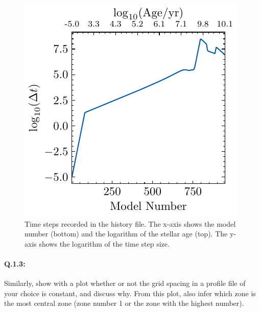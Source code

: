 \documentclass[twocolumn,fontsize=11pt]{scrartcl}
\begin{document}
\begin{figure}[htbp]
    \centering
    \includegraphics{log_dt_vs_model_number.pdf}
    \caption{Time steps recorded in the history file. The x-axis shows the model number (bottom) and the logarithm of the stellar age (top). The y-axis shows the logarithm of the time step size.}
    \label{fig:time_steps}
\end{figure}

\paragraph{Q.1.3:} Similarly, show with a plot whether or not the grid spacing in a profile file of your
choice is constant, and discuss why. From this plot, also infer which zone is the most  
central zone (zone number 1 or the zone with the highest number).
\end{document}
